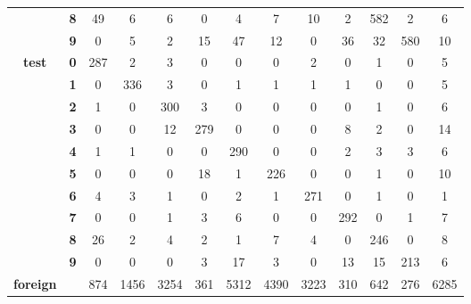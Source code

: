 \begin{table}[htp]
\begin{tabular}{|c|c|c|c|c|c|c|c|c|c|c|c|c|}
		& \textbf{8} & 49         & 6          & 6          & 0          & 4          & 7          & 10         & 2          & 582        & 2          & 6                \\ \cline{2-13} 
		& \textbf{9} & 0          & 5          & 2          & 15         & 47         & 12         & 0          & 36         & 32         & 580        & 10               \\ \hline
		\multirow{10}{*}{\textbf{test}}     & \textbf{0} & 287        & 2          & 3          & 0          & 0          & 0          & 2          & 0          & 1          & 0          & 5                \\ \cline{2-13} 
		& \textbf{1} & 0          & 336        & 3          & 0          & 1          & 1          & 1          & 1          & 0          & 0          & 5                \\ \cline{2-13} 
		& \textbf{2} & 1          & 0          & 300        & 3          & 0          & 0          & 0          & 0          & 1          & 0          & 6                \\ \cline{2-13} 
		& \textbf{3} & 0          & 0          & 12         & 279        & 0          & 0          & 0          & 8          & 2          & 0          & 14               \\ \cline{2-13} 
		& \textbf{4} & 1          & 1          & 0          & 0          & 290        & 0          & 0          & 2          & 3          & 3          & 6                \\ \cline{2-13} 
		& \textbf{5} & 0          & 0          & 0          & 18         & 1          & 226        & 0          & 0          & 1          & 0          & 10               \\ \cline{2-13} 
		& \textbf{6} & 4          & 3          & 1          & 0          & 2          & 1          & 271        & 0          & 1          & 0          & 1                \\ \cline{2-13} 
		& \textbf{7} & 0          & 0          & 1          & 3          & 6          & 0          & 0          & 292        & 0          & 1          & 7                \\ \cline{2-13} 
		& \textbf{8} & 26         & 2          & 4          & 2          & 1          & 7          & 4          & 0          & 246        & 0          & 8                \\ \cline{2-13} 
		& \textbf{9} & 0          & 0          & 0          & 3          & 17         & 3          & 0          & 13         & 15         & 213        & 6                \\ \hline
		\textbf{foreign}                    & \textbf{}  & 874        & 1456       & 3254       & 361        & 5312       & 4390       & 3223       & 310        & 642        & 276        & 6285             \\ \hline
	\end{tabular}
\end{table}